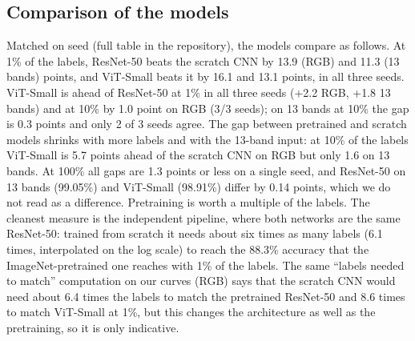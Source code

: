 \documentclass[twoside,a4paper,11pt]{article}
\begin{document}
\subsection{Comparison of the models}
Matched on seed (full table in the repository), the models compare as follows. At 1\% of the labels, ResNet-50 beats the scratch CNN by 13.9 (RGB) and 11.3 (13 bands) points, and ViT-Small beats it by 16.1 and 13.1 points, in all three seeds. ViT-Small is ahead of ResNet-50 at 1\% in all three seeds (+2.2 RGB, +1.8 13 bands) and at 10\% by 1.0 point on RGB (3/3 seeds); on 13 bands at 10\% the gap is 0.3 points and only 2 of 3 seeds agree. The gap between pretrained and scratch models shrinks with more labels and with the 13-band input: at 10\% of the labels ViT-Small is 5.7 points ahead of the scratch CNN on RGB but only 1.6 on 13 bands. At 100\% all gaps are 1.3 points or less on a single seed, and ResNet-50 on 13 bands (99.05\%) and ViT-Small (98.91\%) differ by 0.14 points, which we do not read as a difference. Pretraining is worth a multiple of the labels. The cleanest measure is the independent pipeline, where both networks are the same ResNet-50: trained from scratch it needs about six times as many labels (6.1 times, interpolated on the log scale) to reach the 88.3\% accuracy that the ImageNet-pretrained one reaches with 1\% of the labels. The same ``labels needed to match'' computation on our curves (RGB) says that the scratch CNN would need about 6.4 times the labels to match the pretrained ResNet-50 and 8.6 times to match ViT-Small at 1\%, but this changes the architecture as well as the pretraining, so it is only indicative.
\end{document}
